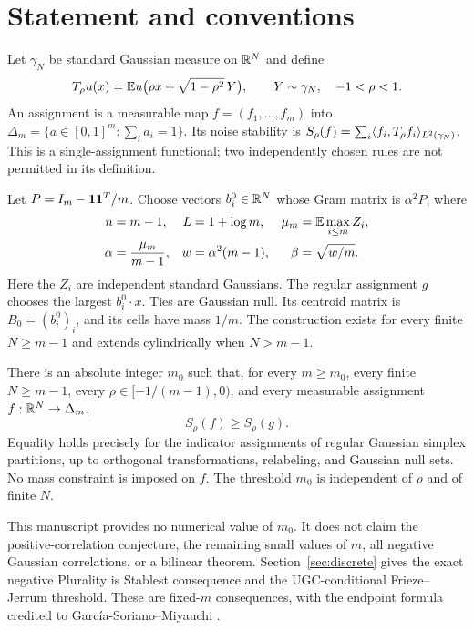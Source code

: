 \section{Statement and conventions}
Let $\gamma_N$ be standard Gaussian measure on $\mathbb R^N$ and define
\[
 T_\rho u(x)=\mathbb E u\bigl(\rho x+\sqrt{1-\rho^2}\,Y\bigr),
 \qquad Y\sim\gamma_N,\quad -1<\rho<1.
\]
An assignment is a measurable map $f=(f_1,\ldots,f_m)$ into
$\Delta_m=\{a\in[0,1]^m:\sum_i a_i=1\}$. Its noise stability is
$S_\rho(f)=\sum_i\langle f_i,T_\rho f_i\rangle_{L^2(\gamma_N)}$.
This is a single-assignment functional; two independently chosen rules
are not permitted in its definition.

Let $P=I_m-\mathbf 1\mathbf 1^T/m$. Choose vectors $b_i^0\in\mathbb R^N$ whose Gram
matrix is $\alpha^2P$, where
\begin{equation}\label{eq:scales}
\begin{aligned}
 n&=m-1,& L&=1+\log m,& \mu_m&=\mathbb E\max_{i\le m}Z_i,\\
 \alpha&=\frac{\mu_m}{m-1},& w&=\alpha^2(m-1),&
 \beta&=\sqrt{w/m}.
\end{aligned}
\end{equation}
Here the $Z_i$ are independent standard Gaussians. The regular assignment
$g$ chooses the largest $b_i^0\cdot x$. Ties are Gaussian null. Its
centroid matrix is $B_0=(b_i^0)_i$, and its cells have mass $1/m$.
The construction exists for every finite $N\ge m-1$ and extends
cylindrically when $N>m-1$.

\begin{theorem}\label{thm:main}
There is an absolute integer $m_0$ such that, for every $m\ge m_0$,
every finite $N\ge m-1$, every $\rho\in[-1/(m-1),0)$, and every
measurable assignment $f:\mathbb R^N\to\Delta_m$,
\[
                         S_\rho(f)\ge S_\rho(g).
\]
Equality holds precisely for the indicator assignments of regular
Gaussian simplex partitions, up to orthogonal transformations,
relabeling, and Gaussian null sets. No mass constraint is imposed on $f$.
The threshold $m_0$ is independent of $\rho$ and of finite $N$.
\end{theorem}

This manuscript provides no numerical value of $m_0$. It does not claim
the positive-correlation conjecture, the remaining small values of $m$,
all negative Gaussian correlations, or a bilinear theorem. Section~\ref{sec:discrete}
gives the exact negative Plurality is Stablest consequence and the
UGC-conditional Frieze--Jerrum threshold. These are fixed-$m$ consequences,
with the endpoint formula credited to Garc\'ia-Soriano--Miyauchi \cite{GSM}.

